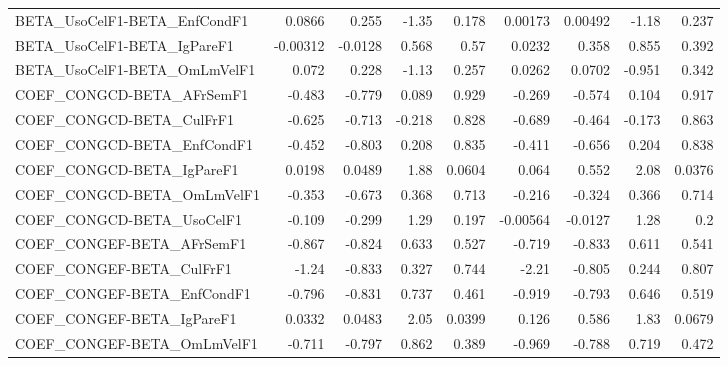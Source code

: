 \begin{tabular}{lrrrrrrrr}
BETA\_UsoCelF1-BETA\_EnfCondF1          &      0.0866 &        0.255 &    -1.35 &    0.178 &    0.00173 &     0.00492 &        -1.18 &         0.237 \\
BETA\_UsoCelF1-BETA\_IgPareF1           &    -0.00312 &      -0.0128 &    0.568 &     0.57 &     0.0232 &       0.358 &        0.855 &         0.392 \\
BETA\_UsoCelF1-BETA\_OmLmVelF1          &       0.072 &        0.228 &    -1.13 &    0.257 &     0.0262 &      0.0702 &       -0.951 &         0.342 \\
COEF\_CONGCD-BETA\_AFrSemF1             &      -0.483 &       -0.779 &    0.089 &    0.929 &     -0.269 &      -0.574 &        0.104 &         0.917 \\
COEF\_CONGCD-BETA\_CulFrF1              &      -0.625 &       -0.713 &   -0.218 &    0.828 &     -0.689 &      -0.464 &       -0.173 &         0.863 \\
COEF\_CONGCD-BETA\_EnfCondF1            &      -0.452 &       -0.803 &    0.208 &    0.835 &     -0.411 &      -0.656 &        0.204 &         0.838 \\
COEF\_CONGCD-BETA\_IgPareF1             &      0.0198 &       0.0489 &     1.88 &   0.0604 &      0.064 &       0.552 &         2.08 &        0.0376 \\
COEF\_CONGCD-BETA\_OmLmVelF1            &      -0.353 &       -0.673 &    0.368 &    0.713 &     -0.216 &      -0.324 &        0.366 &         0.714 \\
COEF\_CONGCD-BETA\_UsoCelF1             &      -0.109 &       -0.299 &     1.29 &    0.197 &   -0.00564 &     -0.0127 &         1.28 &           0.2 \\
COEF\_CONGEF-BETA\_AFrSemF1             &      -0.867 &       -0.824 &    0.633 &    0.527 &     -0.719 &      -0.833 &        0.611 &         0.541 \\
COEF\_CONGEF-BETA\_CulFrF1              &       -1.24 &       -0.833 &    0.327 &    0.744 &      -2.21 &      -0.805 &        0.244 &         0.807 \\
COEF\_CONGEF-BETA\_EnfCondF1            &      -0.796 &       -0.831 &    0.737 &    0.461 &     -0.919 &      -0.793 &        0.646 &         0.519 \\
COEF\_CONGEF-BETA\_IgPareF1             &      0.0332 &       0.0483 &     2.05 &   0.0399 &      0.126 &       0.586 &         1.83 &        0.0679 \\
COEF\_CONGEF-BETA\_OmLmVelF1            &      -0.711 &       -0.797 &    0.862 &    0.389 &     -0.969 &      -0.788 &        0.719 &         0.472 \\

\end{tabular}
